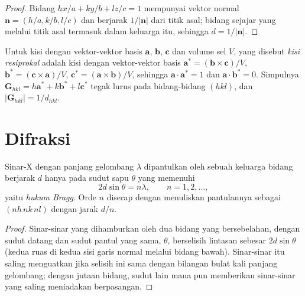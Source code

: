 \begin{proof}
Bidang $hx/a + ky/b + lz/c = 1$ mempunyai vektor normal $\mathbf n = (h/a, k/b, l/c)$
dan berjarak $1/|\mathbf n|$ dari titik asal; bidang sejajar yang melalui titik
asal termasuk dalam keluarga itu, sehingga $d = 1/|\mathbf n|$.
\end{proof}

\begin{definition}\label{def:b3:x-ray-diffraction:reciprocal}
Untuk kisi dengan vektor-vektor basis $\mathbf a$, $\mathbf b$, $\mathbf c$ dan volume
sel $V$, yang disebut \emph{kisi resiprokal} adalah
kisi dengan vektor-vektor basis
$\mathbf a^* = (\mathbf b\times\mathbf c)/V$, $\mathbf b^* = (\mathbf c\times\mathbf a)/V$,
$\mathbf c^* = (\mathbf a\times\mathbf b)/V$, sehingga $\mathbf a\cdot\mathbf a^* = 1$ dan
$\mathbf a\cdot\mathbf b^* = 0$. Simpulnya $\mathbf G_{hkl} = h\mathbf a^* + k\mathbf b^* + l\mathbf c^*$
tegak lurus pada bidang-bidang $(hkl)$, dan $|\mathbf G_{hkl}| = 1/d_{hkl}$.
\end{definition}

\section{Difraksi}

\begin{theorem}\label{thm:b3:x-ray-diffraction:bragg}
Sinar-X dengan panjang gelombang $\lambda$ dipantulkan oleh sebuah keluarga
bidang berjarak $d$ hanya pada sudut sapu $\theta$ yang memenuhi
\[
2d\sin\theta = n\lambda, \qquad n = 1, 2, \dots,
\]
yaitu \emph{hukum Bragg}. Orde $n$ diserap dengan menuliskan
pantulannya sebagai $(nh\,nk\,nl)$ dengan jarak $d/n$.
\end{theorem}

\begin{proof}
Sinar-sinar yang dihamburkan oleh dua bidang yang bersebelahan, dengan sudut
datang dan sudut pantul yang sama, $\theta$, berselisih lintasan sebesar
$2d\sin\theta$ (kedua ruas di kedua sisi garis normal melalui bidang bawah).
Sinar-sinar itu saling menguatkan jika selisih ini sama dengan bilangan bulat
kali panjang gelombang; dengan jutaan bidang, sudut lain mana pun memberikan
sinar-sinar yang saling meniadakan berpasangan.
\end{proof}

